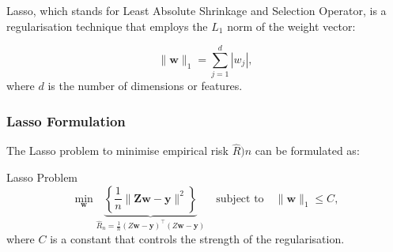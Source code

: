 Lasso, which stands for Least Absolute Shrinkage and Selection Operator, is a regularisation technique that employs the \( L_1 \) norm of the weight vector:

\begin{equation}
\|\mathbf{w}\|_1 = \sum_{j=1}^{d} |w_j|,
\end{equation}
where \( d \) is the number of dimensions or features.

\subsubsection*{Lasso Formulation}
The Lasso problem to minimise empirical risk $\widehat{R})n$ can be formulated as:

\begin{definitionbox}{Lasso Problem}
    \begin{equation}
\min_{\mathbf{w}} \underbrace{\left\{ \frac{1}{n} \|\mathbf{Zw} - \mathbf{y}\|^2 \right\}}_{\widehat R_n=\frac1n(Z\mathbf{w}-\mathbf{y})^\top(Z\mathbf{w}-\mathbf{y})} \quad \text{subject to} \quad \|\mathbf{w}\|_1 \leq C,
\end{equation}
where \( C \) is a constant that controls the strength of the regularisation.
\end{definitionbox}



